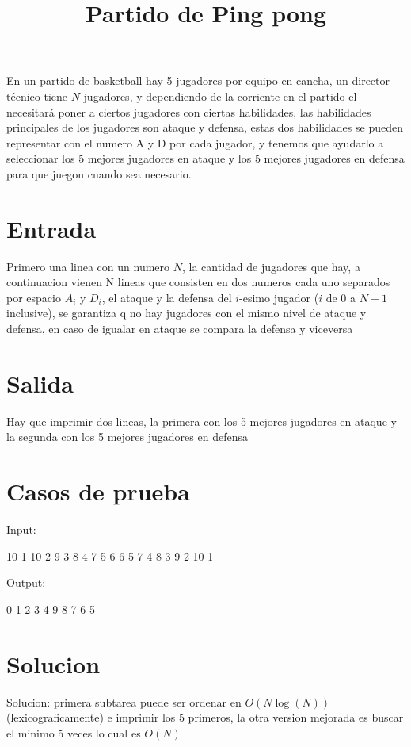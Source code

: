 \documentclass{article}
\title{Partido de Ping pong}
\begin{document}
\maketitle

En un partido de basketball hay 5 jugadores por equipo en cancha, un director técnico tiene $N$ jugadores, y dependiendo de la corriente en el partido
el necesitará poner a ciertos jugadores con ciertas habilidades, las habilidades principales de los jugadores son ataque y defensa, estas dos habilidades
se pueden representar con el numero A y D por cada jugador, y tenemos que ayudarlo a seleccionar los 5 mejores jugadores en ataque y los 5 mejores jugadores
en defensa para que juegon cuando sea necesario.

\section*{Entrada}

Primero una linea con un numero $N$, la cantidad de jugadores que hay, a continuacion vienen N lineas que consisten en dos numeros cada uno separados por espacio
$A_i$ y $D_i$, el ataque y la defensa del $i$-esimo jugador ($i$ de 0 a $N-1$ inclusive), se garantiza q no hay jugadores con el mismo nivel de ataque y defensa, en caso de
igualar en ataque se compara la defensa y viceversa

\section*{Salida}

Hay que imprimir dos lineas, la primera con los 5 mejores jugadores en ataque y la segunda con los 5 mejores jugadores en defensa

\section*{Casos de prueba}

Input:

10
1 10
2 9
3 8
4 7
5 6
6 5
7 4
8 3
9 2
10 1

Output:

0 1 2 3 4
9 8 7 6 5

\section*{Solucion}
Solucion: primera subtarea puede ser ordenar en $O(N\log(N))$ (lexicograficamente) e imprimir los 5 primeros, la otra version mejorada es buscar el minimo 5 veces lo cual es $O(N)$
\end{document}
